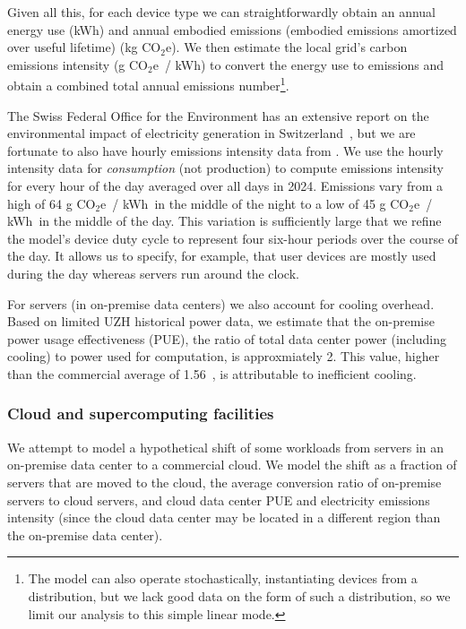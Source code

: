\documentclass[11pt]{article}
\newcommand{\coe}{CO$_2$e}
\newcommand{\gcoe}{g \coe}
\newcommand{\kgcoe}{k\gcoe}
\newcommand{\gcoekwh}{\gcoe\ / kWh}
\begin{document}
Given all this, for each device type we can straightforwardly obtain an annual energy use (kWh) and annual embodied emissions (embodied emissions amortized over useful lifetime) (\kgcoe). We then estimate the local grid's carbon emissions intensity (\gcoekwh) to convert the energy use to emissions and obtain a combined total annual emissions number\footnote{The model can also operate stochastically, instantiating devices from a distribution, but we lack good data on the  form of such a distribution, so we limit our analysis to this simple linear mode.}.

The Swiss Federal Office for the Environment has an extensive report on the environmental impact of electricity generation in Switzerland~\cite{krebs2018umweltbilanz}, but we are fortunate to also have hourly emissions intensity data from \textcite{electricitymaps}. We use the hourly intensity data for {\em consumption} (not production) to compute emissions intensity for every hour of the day averaged over all days in 2024. Emissions vary from a high of 64 \gcoekwh\ in the middle of the night to a low of 45 \gcoekwh\ in the middle of the day. This variation is sufficiently large that we refine the model's device duty cycle to represent four six-hour periods over the course of the day. It allows us to specify, for example, that user devices are mostly used during the day whereas servers run around the clock.

For servers (in on-premise data centers) we also account for cooling overhead. Based on limited UZH historical power data, we estimate that the on-premise power usage effectiveness (PUE), the ratio of total data center power (including cooling) to power used for computation, is approxmiately 2. This value, higher than the commercial average of 1.56~\cite{google:datacenter:efficiency}, is attributable to inefficient cooling.

\subsubsection*{Cloud and supercomputing facilities}

We attempt to model a hypothetical shift of some workloads from servers in an on-premise data center to a commercial cloud. We model the shift as a fraction of servers that are moved to the cloud, the average conversion ratio of on-premise servers to cloud servers, and cloud data center PUE and electricity emissions intensity (since the cloud data center may be located in a different region than the on-premise data center).
\end{document}
